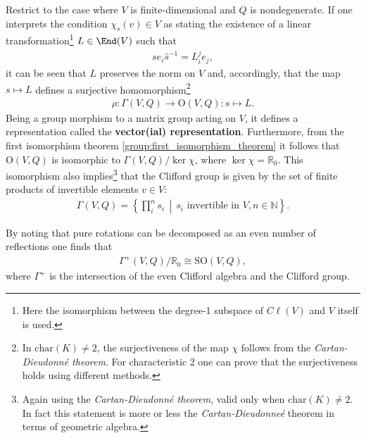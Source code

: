     \begin{property}
        Restrict to the case where $V$ is finite-dimensional and $Q$ is nondegenerate. If one interprets the condition $\chi_s(v)\in V$ as stating the existence of a linear transformation\footnote{Here the isomorphism between the degree-1 subspace of $C\ell(V)$ and $V$ itself is used.} $L\in\End(V)$ such that
        \begin{gather}
            se_i\hat{s}^{-1} = L^j_ie_j,
        \end{gather}
        it can be seen that $L$ preserves the norm on $V$ and, accordingly, that the map $s\mapsto L$ defines a surjective homomorphism\footnote{In $\mathrm{char}(K)\neq2$, the surjectiveness of the map $\chi$ follows from the \textit{Cartan-Dieudonn\'e theorem}. For characteristic 2 one can prove that the surjectiveness holds using different methods.}
        \begin{gather}
            \rho:\Gamma(V,Q)\rightarrow\mathrm{O}(V,Q):s\mapsto L.
        \end{gather}
        Being a group morphism to a matrix group acting on $V$, it defines a representation called the \textbf{vector(ial) representation}. Furthermore, from the first isomorphism theorem \ref{group:first_isomorphism_theorem} it follows that $\mathrm{O}(V,Q)$ is isomorphic to $\Gamma(V,Q)/\ker\chi$, where $\ker\chi = \mathbb{R}_0$. This isomorphism also implies\footnote{Again using the \textit{Cartan-Dieudonn\'e theorem}, valid only when $\mathrm{char}(K)\neq2$. In fact this statement is more or less the \textit{Cartan-Dieudonne\'e} theorem in terms of geometric algebra.} that the Clifford group is given by the set of finite products of invertible elements $v\in V$:
        \begin{gather}
            \Gamma(V,Q) = \left\{\prod_i^n s_i\,\middle\vert\,s_i\text{ invertible in }V,n\in\mathbb{N}\right\}.
        \end{gather}
    \end{property}
    \begin{result}
        By noting that pure rotations can be decomposed as an even number of reflections one finds that
        \begin{gather}
            \Gamma^+(V,Q)/\mathbb{R}_0\cong\mathrm{SO}(V,Q),
        \end{gather}
        where $\Gamma^+$ is the intersection of the even Clifford algebra and the Clifford group.
    \end{result}

